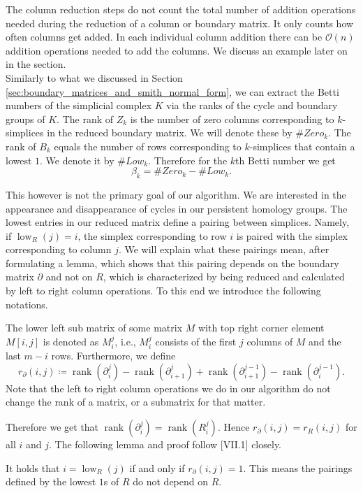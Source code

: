 The column reduction steps do not count the total number of addition operations needed during the reduction of a column or boundary matrix. It only counts how often columns get added. In each individual column addition there can be $\mathcal{O}(n)$ addition operations needed to add the columns. We discuss an example later on in the section. \\

Similarly to what we discussed in Section \ref{sec:boundary_matrices_and_smith_normal_form}, we can extract the Betti numbers of the simplicial complex $K$ via the ranks of the cycle and boundary groups of $K$. The rank of $Z_k$ is the number of zero columns corresponding to $k$-simplices in the reduced boundary matrix. We will denote these by $\#Zero_k$. The rank of $B_k$ equals the number of rows corresponding to $k$-simplices that contain a lowest $1$. We denote it by $\#Low_k$. Therefore for the $k$th Betti number we get \[
\beta_k = \#Zero_k - \#Low_k.
\]

This however is not the primary goal of our algorithm. We are interested in the appearance and disappearance of cycles in our persistent homology groups. The lowest entries in our reduced matrix define a pairing between simplices. Namely, if $\operatorname{low}_R(j)= i$, the simplex corresponding to row $i$ is paired with the simplex corresponding to column $j$. We will explain what these pairings mean, after formulating a lemma, which shows that this pairing depends on the boundary matrix $\partial$ and not on $R$, which is characterized by being reduced and calculated by left to right column operations. To this end we introduce the following notations.

The lower left sub matrix of some matrix $M$ with top right corner element $M[i,j]$ is denoted as $M_i^j$, i.e., $M_i^j$ consists of the first $j$ columns of $M$ and the last $m-i$ rows. Furthermore, we define \[
r_\partial(i,j) \coloneqq \operatorname{rank}(\partial_i^j) - \operatorname{rank}(\partial_{i+1}^{j}) + \operatorname{rank}(\partial_{i+1}^{j-1}) - \operatorname{rank}(\partial_{i}^{j-1}).
\]
Note that the left to right column operations we do in our algorithm do not change the rank of a matrix, or a submatrix for that matter. 

Therefore we get that $\operatorname{rank}(\partial_i^j) = \operatorname{rank}(R_i^j) $. Hence $r_\partial(i,j) = r_R(i,j)$ for all $i$ and $j$. The following lemma and proof follow \cite{Computational+Topology}[VII.1] closely.

\begin{lemma}

It holds that $i = \operatorname{low}_R(j)$ if and only if $r_\partial(i,j) = 1$. This means the pairings defined by the lowest $1$s of $R$ do not depend on $R$.

\end{lemma}

